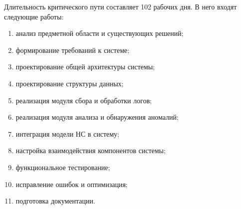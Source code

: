 Длительность критического пути составляет 102 рабочих дня. В него входят следующие работы:

\begin{enumerate}
    \item анализ предметной области и существующих решений;
    \item формирование требований к системе;
    \item проектирование общей архитектуры системы;
    \item проектирование структуры данных;
    \item реализация модуля сбора и обработки логов;
    \item реализация модуля анализа и обнаружения аномалий;
    \item интеграция модели НС в систему;
    \item настройка взаимодействия компонентов системы;
    \item функциональное тестирование;
    \item исправление ошибок и оптимизация;
    \item подготовка документации.
\end{enumerate}

